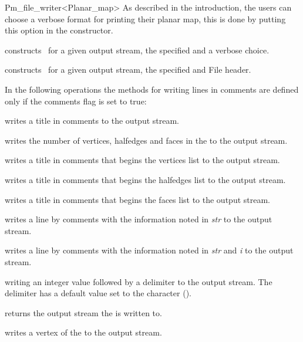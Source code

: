 \begin{ccRefClass}{Pm_file_writer<Planar_map>}
\ccCreation
As described in the introduction, the  users can choose a verbose format for 
printing their planar map, this is done by putting this option in the constructor.

{constructs \ccRefName\ for a given output stream, the specified  and a verbose choice.}

{constructs \ccRefName\ for a given output stream, the specified  and {File header}.}

\ccOperations

In the following operations the methods for writing lines in 
comments are defined only if the comments flag is set to true:

{writes a title in comments to the output stream.}

{writes the number of vertices, halfedges and faces in the  to the output stream.}

{writes a title in comments that begins the vertices list to the output stream.}

{writes a title in comments that begins the halfedges list to the output stream.}

{writes a title in comments that begins the faces list to the output stream.}

{writes a line by comments with the information noted in {\em str} to the output stream.}

{writes a line by comments with the information noted in {\em str} and {\em i} to the output stream.}

{writing an integer value followed by a delimiter to the output stream.
 The delimiter has a default value set to the  character
 ().}

{returns the output stream the  is written to.} 

{writes a vertex of the  to the output stream.}


\end{ccRefClass}
